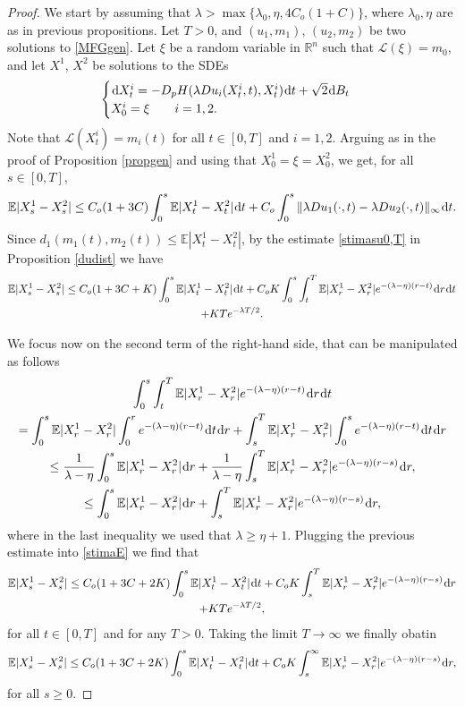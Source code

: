 \documentclass{amsart}
\theoremstyle{remark}
\theoremstyle{definition}
\theoremstyle{Claim}
\newcommand{\E}{\mathbb{E}}
\newcommand{\R}{\mathbb{R}}
\newcommand{\dd}{\hspace{0.7pt}{\rm d}}
\theoremstyle{plain}
\begin{document}
	\begin{proof} We start by assuming that $\lambda > \max\{\lambda_0, \eta, {4C_o(1+C)}\}$, where $\lambda_0, \eta$ are as in previous propositions. Let $T>0$, and  $(u_1,m_1)$, $(u_2,m_2)$ be two solutions to \eqref{MFGgen}.  Let $\xi$ be a random variable in $\R^n$ such that $\mathcal L(\xi) = m_0$, and let $X^1$, $X^2$ be solutions to the SDEs
\[
\begin{cases}
\dd X^i_t = -D_p H(\lambda D u_i(X^i_t,t),X^i_t) \dd t + \sqrt2 \dd B_t \\
X^i_0 = \xi \qquad i=1,2.
\end{cases}
\]
Note that $\mathcal L(X^i_t) = m_i(t)$ for all $t \in [0,T]$ and $i=1,2$. Arguing as in the proof of Proposition \ref{propgen} and using that $X^1_0=\xi=X^2_0$, we get, for all $s \in [0,T]$,
\[
\E |X^1_s - X^2_s| \le {C_o(1+3C)}\int_0^s {\E}\lvert X^1_t-X^2_t\rvert \dd t + {C_o} \int_0^s  \| \lambda D u_1(\cdot,t) - \lambda D u_2(\cdot,t) \|_\infty \dd t.
\]
Since $d_1(m_1(t), m_2(t)) \le \E |X^1_t - X^2_t|$, by the estimate \eqref{stimasu0,T} in Proposition \ref{dudist} we have
	\begin{multline}\label{stimaE}
		\E |X^1_s - X^2_s| \le {C_o(1+3C+K)} \int_0^s\E \lvert X^1_t-X^2_t\rvert \dd t + {C_oK} \int_0^s  \int_{t}^{T} \E \lvert X^1_r-X^2_r\rvert e^{-(\lambda - \eta) (r-t)}  \dd r  \dd t\\
		+ KTe^{-\lambda T/2}.
	\end{multline}

	We focus now on the second term of the right-hand side, that can be manipulated as follows
	\begin{multline*}
	\int_0^s  \int_{t}^{T} \E \lvert X^1_r-X^2_r\rvert e^{-(\lambda - \eta) (r-t)}  \dd r  \dd t  \\ =\int_0^s  \E \lvert X^1_r-X^2_r\rvert\int_{0}^{r} e^{-(\lambda - \eta) (r-t)}  \dd t  \dd r + 
	     \int_s^T   \E \lvert X^1_r-X^2_r\rvert \int_{0}^{s} e^{-(\lambda - \eta) (r-t)}  \dd t  \dd r \\
	     \le \frac1{\lambda - \eta} \int_0^s  \E \lvert X^1_r-X^2_r\rvert \dd r + \frac1{\lambda - \eta} \int_s^T  \E \lvert X^1_r-X^2_r\rvert e^{-(\lambda - \eta) (r-s)}  \dd r, \\
	     \le  \int_0^s  \E \lvert X^1_r-X^2_r\rvert \dd r +  \int_s^T  \E \lvert X^1_r-X^2_r\rvert e^{-(\lambda - \eta) (r-s)}  \dd r,
	\end{multline*}
	where in the last inequality we used that $\lambda \ge \eta +1$. Plugging the previous estimate into \eqref{stimaE} we find that 
	\begin{multline*}
			\E |X^1_s - X^2_s| \le {C_o(1+3C+2K)} \int_0^s\E \lvert X^1_t-X^2_t\rvert \dd t + {C_oK} \int_s^{T}  \E \lvert X^1_r-X^2_r\rvert e^{-(\lambda - \eta) (r-s)}  \dd r\\
			+KTe^{-\lambda T/2},
	\end{multline*}
	for all $t\in [0,T]$ and for any $T>0$. Taking the limit $T \to \infty$ we finally obatin
	\[\E |X^1_s - X^2_s| \le {C_o(1+3C+2K)} \int_0^s\E \lvert X^1_t-X^2_t\rvert \dd t + {C_oK}\int_s^{\infty}  \E \lvert X^1_r-X^2_r\rvert e^{-(\lambda - \eta) (r-s)}  \dd r,
	\]
	for all $s\geq 0$.
	

\end{proof}
\end{document}
